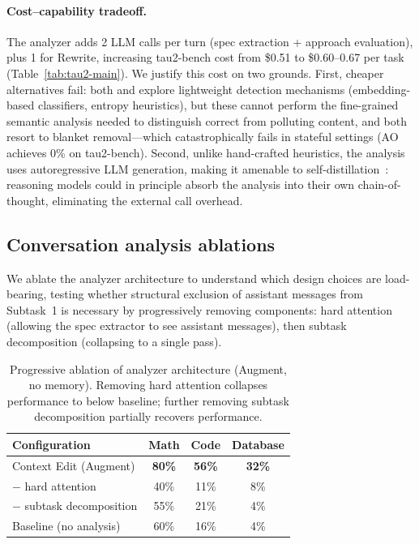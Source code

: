 \documentclass{article} %
\begin{document}
\paragraph{Cost--capability tradeoff.} The analyzer adds 2 LLM calls per turn (spec extraction + approach evaluation), plus 1 for Rewrite, increasing tau2-bench cost from \$0.51 to \$0.60--0.67 per task (Table~\ref{tab:tau2-main}). We justify this cost on two grounds. First, cheaper alternatives fail: both \citet{huang2026context} and \citet{khalid2025ergo} explore lightweight detection mechanisms (embedding-based classifiers, entropy heuristics), but these cannot perform the fine-grained semantic analysis needed to distinguish correct from polluting content, and both resort to blanket removal---which catastrophically fails in stateful settings (AO achieves 0\% on tau2-bench). Second, unlike hand-crafted heuristics, the analysis uses autoregressive LLM generation, making it amenable to self-distillation~\citep{zhao2026selfdistillreason,hubotter2026rlselfdistill,shenfeld2026selfdistill}: reasoning models could in principle absorb the analysis into their own chain-of-thought, eliminating the external call overhead.


\subsection{Conversation analysis ablations}
\label{sec:analysis-ablations}

We ablate the analyzer architecture to understand which design choices are load-bearing, testing whether structural exclusion of assistant messages from Subtask~1 is necessary by progressively removing components: hard attention (allowing the spec extractor to see assistant messages), then subtask decomposition (collapsing to a single pass).
\label{sec:cognitive-hazard}

\begin{table}[t]
\centering
\begin{tabular}{lccc}
\toprule
\textbf{Configuration} & \textbf{Math} & \textbf{Code} & \textbf{Database} \\
\midrule
Context Edit (Augment) & \textbf{80\%} & \textbf{56\%} & \textbf{32\%} \\
\quad $-$ hard attention & 40\% & 11\% & 8\% \\
\quad\quad $-$ subtask decomposition & 55\% & 21\% & 4\% \\
\midrule
Baseline (no analysis) & 60\% & 16\% & 4\% \\
\bottomrule
\end{tabular}
\caption{Progressive ablation of analyzer architecture (Augment, no memory). Removing hard attention collapses performance to below baseline; further removing subtask decomposition partially recovers performance.}
\label{tab:cognitive-hazard}
\end{table}
\end{document}
